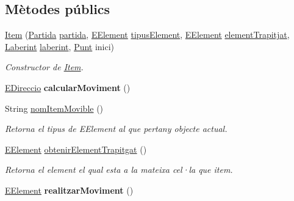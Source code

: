 \subsection*{Mètodes públics}
\begin{DoxyCompactItemize}
\item 
\hyperlink{classlogica_1_1_item_ac19a70f15ff1f377848f1df34a6e1137}{Item} (\hyperlink{classlogica_1_1_partida}{Partida} \hyperlink{classlogica_1_1_item_movible_ace55b4918a7f671f89ed3109c91359e4}{partida}, \hyperlink{enumlogica_1_1enumeracions_1_1_e_element}{E\+Element} \hyperlink{classlogica_1_1_item_a8f4061141a64a72969be035b8d689fb9}{tipus\+Element}, \hyperlink{enumlogica_1_1enumeracions_1_1_e_element}{E\+Element} \hyperlink{classlogica_1_1_item_a526b80840c8330393362f26926c33f07}{element\+Trapitjat}, \hyperlink{classlogica_1_1laberints_1_1_laberint}{Laberint} \hyperlink{classlogica_1_1_item_movible_a97036130b7376d77776427ca126f6fb5}{laberint}, \hyperlink{classlogica_1_1_punt}{Punt} inici)
\begin{DoxyCompactList}\small\item\em Constructor de \hyperlink{classlogica_1_1_item}{Item}. \end{DoxyCompactList}\item 
\hypertarget{classlogica_1_1_item_a0b85057e526c921f66a586e334b94685}{\hyperlink{enumlogica_1_1enumeracions_1_1_e_direccio}{E\+Direccio} {\bfseries calcular\+Moviment} ()}\label{classlogica_1_1_item_a0b85057e526c921f66a586e334b94685}

\item 
\hypertarget{classlogica_1_1_item_a729ac980199af2b84c3dc6ef14b57e43}{String \hyperlink{classlogica_1_1_item_a729ac980199af2b84c3dc6ef14b57e43}{nom\+Item\+Movible} ()}\label{classlogica_1_1_item_a729ac980199af2b84c3dc6ef14b57e43}

\begin{DoxyCompactList}\small\item\em Retorna el tipus de E\+Element al que pertany objecte actual. \end{DoxyCompactList}\item 
\hyperlink{enumlogica_1_1enumeracions_1_1_e_element}{E\+Element} \hyperlink{classlogica_1_1_item_a81cb8508f21f320f54ca5d279fa24625}{obtenir\+Element\+Trapitgat} ()
\begin{DoxyCompactList}\small\item\em Retorna el element el qual esta a la mateixa cel·la que item. \end{DoxyCompactList}\item 
\hypertarget{classlogica_1_1_item_a9990d70a8ad35319d2bb9d10b294b17a}{\hyperlink{enumlogica_1_1enumeracions_1_1_e_element}{E\+Element} {\bfseries realitzar\+Moviment} ()}\label{classlogica_1_1_item_a9990d70a8ad35319d2bb9d10b294b17a}

\end{DoxyCompactItemize}
